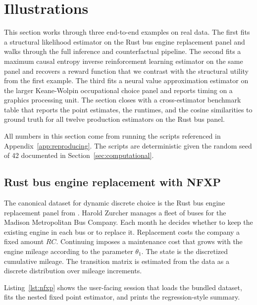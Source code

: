 \section{Illustrations} \label{sec:illustrations}

This section works through three end-to-end examples on real data. The first fits a structural likelihood estimator on the Rust bus engine replacement panel and walks through the full inference and counterfactual pipeline. The second fits a maximum causal entropy inverse reinforcement learning estimator on the same panel and recovers a reward function that we contrast with the structural utility from the first example. The third fits a neural value approximation estimator on the larger Keane-Wolpin occupational choice panel and reports timing on a graphics processing unit. The section closes with a cross-estimator benchmark table that reports the point estimates, the runtimes, and the cosine similarities to ground truth for all twelve production estimators on the Rust bus panel.

All numbers in this section come from running the scripts referenced in Appendix~\ref{app:reproducing}. The scripts are deterministic given the random seed of 42 documented in Section~\ref{sec:computational}.

\subsection{Rust bus engine replacement with NFXP} \label{sec:illustrations:nfxp}

The canonical dataset for dynamic discrete choice is the Rust bus engine replacement panel from \citet{rust1987}. Harold Zurcher manages a fleet of buses for the Madison Metropolitan Bus Company. Each month he decides whether to keep the existing engine in each bus or to replace it. Replacement costs the company a fixed amount $RC$. Continuing imposes a maintenance cost that grows with the engine mileage according to the parameter $\theta_1$. The state is the discretized cumulative mileage. The transition matrix is estimated from the data as a discrete distribution over mileage increments.

Listing~\ref{lst:nfxp} shows the user-facing session that loads the bundled dataset, fits the nested fixed point estimator, and prints the regression-style summary.

